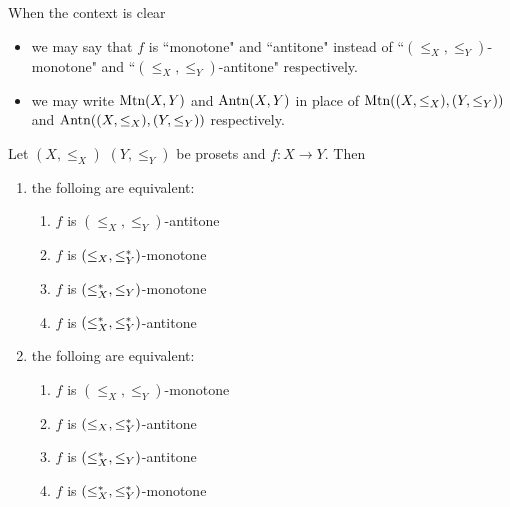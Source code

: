 \documentclass{book}
\begin{document}
	\begin{note}
		When the context is clear 
		\begin{itemize}
			\item we may say that $f$ is ``monotone" and ``antitone" instead of ``$(\leq_X, \leq_Y)$-monotone" and ``$(\leq_X, \leq_Y)$-antitone" respectively.
			\item we may write $\operatorname{\text{Mtn}}(X, Y)$ and $\operatorname{\text{Antn}}(X, Y)$ in place of $\operatorname{\text{Mtn}}((X, \leq_X), (Y, \leq_Y))$ and $\operatorname{\text{Antn}}((X, \leq_X), (Y, \leq_Y))$ respectively. 
		\end{itemize}
	\end{note}
	
	
	\begin{ex} 
		Let $(X, \leq_X)$ $(Y, \leq_Y)$ be prosets and $f:X \rightarrow Y$. Then 
		\begin{enumerate}
			\item 
			the folloing are equivalent: 
			\begin{enumerate}
				\item $f$ is $(\leq_X, \leq_Y)$-antitone 
				\item $f$ is $(\leq_X, \leq^*_Y)$-monotone
				\item $f$ is $(\leq^*_X, \leq_Y)$-monotone
				\item $f$ is $(\leq^*_X, \leq^*_Y)$-antitone
			\end{enumerate}
			\item the folloing are equivalent: 
			\begin{enumerate}
				\item $f$ is $(\leq_X, \leq_Y)$-monotone 
				\item $f$ is $(\leq_X, \leq^*_Y)$-antitone
				\item $f$ is $(\leq^*_X, \leq_Y)$-antitone
				\item $f$ is $(\leq^*_X, \leq^*_Y)$-monotone 
			\end{enumerate}
		\end{enumerate}
	\end{ex}
	
\end{document}
